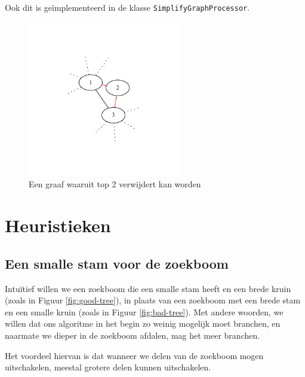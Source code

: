 \documentclass{article}
\begin{document}
Ook dit is ge\"implementeerd in de klasse \verb#SimplifyGraphProcessor#.

\begin{figure}
\begin{center}
\includegraphics[width=0.6\textwidth]{images/two-neighbours-connected.pdf}
\caption{Een graaf waaruit top 2 verwijdert kan worden}
\label{fig:two-neighbours-connected}
\end{center}
\end{figure}

\section{Heuristieken}

\subsection{Een smalle stam voor de zoekboom}
\label{heuristiek-sorteren}
Intu\"itief willen we een zoekboom die een smalle stam heeft en een brede kruin
(zoals in Figuur \ref{fig:good-tree}), in plaats van een zoekboom met een brede
stam en een smalle kruin (zoals in Figuur \ref{fig:bad-tree}). Met andere
woorden, we willen dat ons algoritme in het begin zo weinig mogelijk moet
branchen, en naarmate we dieper in de zoekboom afdalen, mag het meer branchen.
\newline

Het voordeel hiervan is dat wanneer we delen van de zoekboom mogen uitschakelen,
meestal grotere delen kunnen uitschakelen.
\newline
\end{document}
